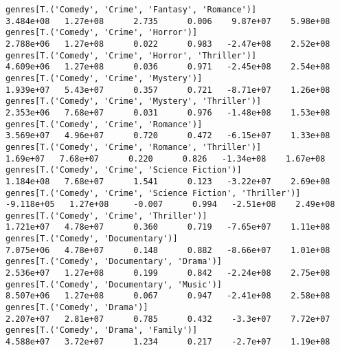 \documentclass[11pt]{article}
\begin{document}
\begin{Verbatim}[commandchars=\\\{\}]
genres[T.('Comedy', 'Crime', 'Fantasy', 'Romance')]                                                           3.484e+08   1.27e+08      2.735      0.006    9.87e+07    5.98e+08
genres[T.('Comedy', 'Crime', 'Horror')]                                                                       2.788e+06   1.27e+08      0.022      0.983   -2.47e+08    2.52e+08
genres[T.('Comedy', 'Crime', 'Horror', 'Thriller')]                                                           4.609e+06   1.27e+08      0.036      0.971   -2.45e+08    2.54e+08
genres[T.('Comedy', 'Crime', 'Mystery')]                                                                      1.939e+07   5.43e+07      0.357      0.721   -8.71e+07    1.26e+08
genres[T.('Comedy', 'Crime', 'Mystery', 'Thriller')]                                                          2.353e+06   7.68e+07      0.031      0.976   -1.48e+08    1.53e+08
genres[T.('Comedy', 'Crime', 'Romance')]                                                                      3.569e+07   4.96e+07      0.720      0.472   -6.15e+07    1.33e+08
genres[T.('Comedy', 'Crime', 'Romance', 'Thriller')]                                                           1.69e+07   7.68e+07      0.220      0.826   -1.34e+08    1.67e+08
genres[T.('Comedy', 'Crime', 'Science Fiction')]                                                              1.184e+08   7.68e+07      1.541      0.123   -3.22e+07    2.69e+08
genres[T.('Comedy', 'Crime', 'Science Fiction', 'Thriller')]                                                 -9.118e+05   1.27e+08     -0.007      0.994   -2.51e+08    2.49e+08
genres[T.('Comedy', 'Crime', 'Thriller')]                                                                     1.721e+07   4.78e+07      0.360      0.719   -7.65e+07    1.11e+08
genres[T.('Comedy', 'Documentary')]                                                                           7.075e+06   4.78e+07      0.148      0.882   -8.66e+07    1.01e+08
genres[T.('Comedy', 'Documentary', 'Drama')]                                                                  2.536e+07   1.27e+08      0.199      0.842   -2.24e+08    2.75e+08
genres[T.('Comedy', 'Documentary', 'Music')]                                                                  8.507e+06   1.27e+08      0.067      0.947   -2.41e+08    2.58e+08
genres[T.('Comedy', 'Drama')]                                                                                 2.207e+07   2.81e+07      0.785      0.432    -3.3e+07    7.72e+07
genres[T.('Comedy', 'Drama', 'Family')]                                                                       4.588e+07   3.72e+07      1.234      0.217    -2.7e+07    1.19e+08

\end{Verbatim}
\end{document}
